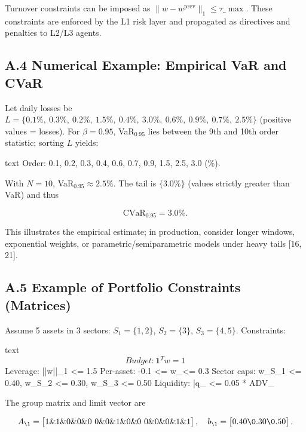 \documentclass[11pt]{article}
\begin{document}
Turnover constraints can be imposed as $\|w-w^{\text{prev}}\|_1 \le \tau\_{\max}$. These constraints are enforced by the L1 risk layer and propagated as directives and penalties to L2/L3 agents.

\subsection{A.4 Numerical Example: Empirical VaR and CVaR}

Let daily losses be $L=\{0.1\%,\ 0.3\%,\ 0.2\%,\ 1.5\%,\ 0.4\%,\ 3.0\%,\ 0.6\%,\ 0.9\%,\ 0.7\%,\ 2.5\%\}$ (positive values = losses). For $\beta=0.95$, VaR$_{0.95}$ lies between the 9th and 10th order statistic; sorting $L$ yields:

text
Order: 0.1, 0.2, 0.3, 0.4, 0.6, 0.7, 0.9, 1.5, 2.5, 3.0 (\%).


With $N=10$, VaR$_{0.95}\approx 2.5\%$. The tail is $\{3.0\%\}$ (values strictly greater than VaR) and thus

\begin{equation}
\mathrm{CVaR}_{0.95} = 3.0\%.
\end{equation}

This illustrates the empirical estimate; in production, consider longer windows, exponential weights, or parametric/semiparametric models under heavy tails [16, 21].

\subsection{A.5 Example of Portfolio Constraints (Matrices)}

Assume 5 assets in 3 sectors: $S_1=\{1,2\}$, $S_2=\{3\}$, $S_3=\{4,5\}$. Constraints:

text
\begin{equation}
Budget:        \mathbf{1}^T w = 1
\end{equation}
Leverage:      ||w||_1 <= 1.5
Per-asset:     -0.1 <= w_{\text{\1}}\2<= 0.3
Sector caps:   w_{S_1} <= 0.40, w_{S_2} <= 0.30, w_{S_3} <= 0.50
Liquidity:     |q_{\text{\1}}\2 <= 0.05 * ADV_{\text{\1}}\2

The group matrix and limit vector are

\begin{equation}
A_{\text{\1}} = \begin{bmatrix}
1 \& 1 \& 0 \& 0 \& 0\
0 \& 0 \& 1 \& 0 \& 0\
0 \& 0 \& 0 \& 1 \& 1
\end{bmatrix},\quad b_{\text{\1}} = \begin{bmatrix}0.40\0.30\0.50\end{bmatrix}.
\end{equation}
\end{document}
